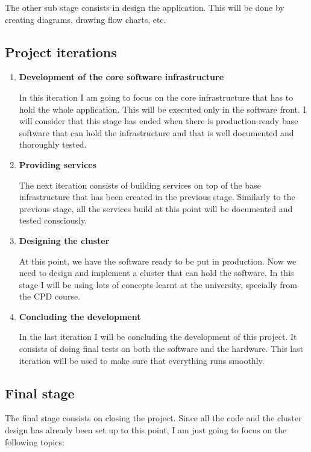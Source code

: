 The other sub stage consists in design the application. This will be done by
creating diagrams, drawing flow charts, etc.

\subsection{Project iterations}

\begin{enumerate}
 \item {\bf Development of the core software infrastructure}

 In this iteration I am going to focus on the core infrastructure that has to
hold the whole application. This will be executed only in the software front.
I will consider that this stage has ended when there is production-ready base
software that can hold the infrastructure and that is well documented and
thoroughly tested.

 \item {\bf Providing services}

 The next iteration consists of building services on top of the base
infrastructure that has been created in the previous stage. Similarly to the
previous stage, all the services build at this point will be documented and
tested consciously.

  \item {\bf Designing the cluster}

  At this point, we have the software ready to be put in production. Now we
need to design and implement a cluster that can hold the software. In this
stage I will be using lots of concepts learnt at the university, specially from
the CPD course.

  \item {\bf Concluding the development}

  In the last iteration I will be concluding the development of this project.
It consists of doing final tests on both the software and the hardware. This
last iteration will be used to make sure that everything runs smoothly.
\end{enumerate}


\subsection{Final stage}

The final stage consists on closing the project. Since all the code and the
cluster design has already been set up to this point, I am just going to focus
on the following topics:

